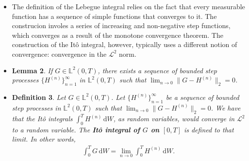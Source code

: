 \documentclass[10pt]{article}
\newtheorem{lemma}{Lemma}
\newtheorem{definition}[lemma]{Definition}
\newtheorem{proposition}[lemma]{Proposition}
\newcommand{\dee}{\mathrm{d}}
\newcommand{\mcal}[1]{\mathcal{#1}}
\begin{document}
\begin{itemize}
  \begin{proposition}
    If $G$ and $H$ are step processes in $\mathbb{L}^2(0,T)$, then 
    \begin{align*}
      \bigg\| \int G\, \dee W - \int H\, \dee H  \bigg\|_2
      = \| G - H \|_2.
    \end{align*}
  \end{proposition}

  \begin{proof}
    We have that
    \begin{align*}
      \bigg\| \int G\, \dee W - \int H\, \dee H  \bigg\|_2
      &= E\bigg[ \bigg( \int_0^T G\, \dee W - \int_0^T H \, \dee W \bigg)^2 \bigg] \\
      &= E\bigg[ \bigg( \int_0^T (G - H) \, \dee W \bigg)^2 \bigg] \\
      &= E\bigg[ \int_0^T (G - H)^2\, \dee t \bigg]\\
      &= \| G - H \|_2^2
    \end{align*}
    as required.
  \end{proof}

  \item The definition of the Lebegue integral relies on the fact that every measurable function has a sequence of simple functions that converges to it. The construcion involes a series of increasing and non-negative step functions, which converges as a result of the monotone convergence theorem. The construction of the It\^{o} integral, however, typically uses a different notion of convergence: convergence in the $\mcal{L}^2$ norm.

  \item \begin{lemma}
    If $G \in \mathbb{L}^2(0,T)$, there exists a sequence of bounded step processes $\{H^{(n)} \}_{n=1}^\infty$ in $\mathbb{L}^2(0,T)$ such that
    $\lim_{n \rightarrow 0} \| G - H^{(n)} \|_2 = 0$.    
  \end{lemma}

  \item \begin{definition}
    Let $G \in \mathbb{L}^2(0,T)$. Let $\{H^{(n)} \}_{n=1}^\infty$ be a sequence of bounded step processes in $\mathbb{L}^2(0,T)$ such that $\lim_{n \rightarrow 0} \| G - H^{(n)} \|_2 = 0$. We have that the It\^{o} integrals $\int_0^T H^{(n)}\, \dee W$, as random variables, would converge in $\mcal{L}^2$ to a random variable. The {\bf It\^{o} integral of $G$ on $[0,T]$} is defined to that limit. In other words,
    \begin{align*}
      \int_0^T G\, \dee W = \lim_{n \rightarrow 0} \int_0^T H^{(n)}\, \dee W.
    \end{align*}    
  \end{definition}
  

\end{itemize}
\end{document}
